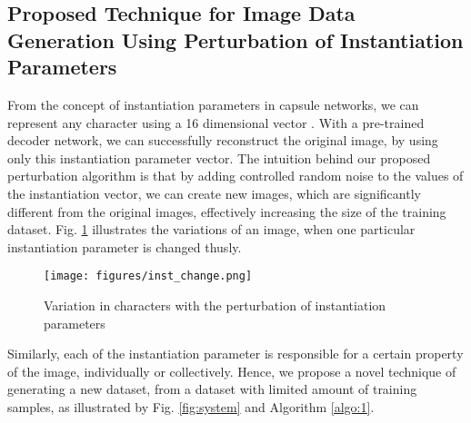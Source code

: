 \subsection{Proposed Technique for Image Data Generation Using Perturbation of Instantiation Parameters}
\label{sec:meth_perturb}


From the concept of instantiation parameters in capsule networks, we can represent any character using a 16 dimensional vector \cite{sabour2017dynamic}. With a pre-trained decoder network, we can successfully reconstruct the original image, by using only this instantiation parameter vector. The intuition behind our proposed perturbation algorithm is that by adding controlled random noise to the values of the instantiation vector, we can create new images, which are significantly different from the original images, effectively increasing the size of the training dataset. Fig. \ref{fig:inst_change} illustrates the variations of an image, when one particular instantiation parameter is changed thusly. 

\begin{figure}[!h]
 \vspace{-2mm}
  \centering
  \texttt{[image: figures/inst\_change.png]}
  \caption{Variation in characters with the perturbation of instantiation parameters}
 \label{fig:inst_change}
 \vspace{-2mm}
\end{figure}

Similarly, each of the instantiation parameter is responsible for a certain property of the image, individually or collectively. Hence, we propose a novel technique of generating a new dataset, from a dataset with limited amount of training samples, as illustrated by Fig. \ref{fig:system} and Algorithm \ref{algo:1}.


